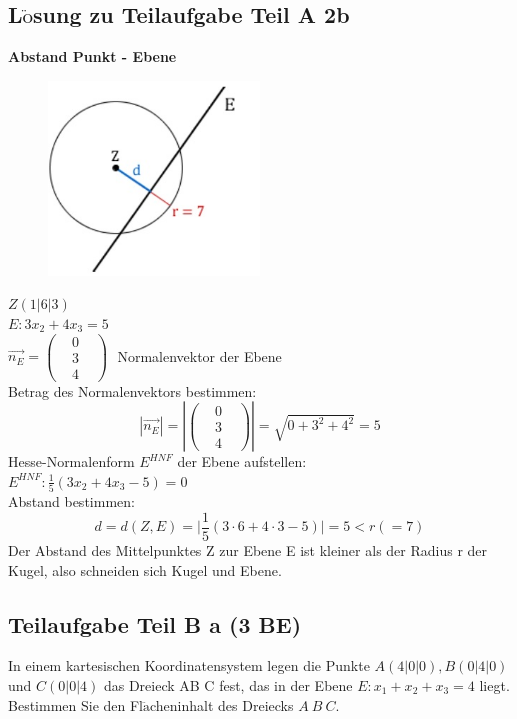 \documentclass[a4 paper, 12pt]{report}
\theoremstyle{plain}
\begin{document}
\subsection*{L$\ddot{\mbox{o}}$sung zu Teilaufgabe Teil A 2b}
\textbf{Abstand Punkt - Ebene}
\begin{figure}[h]
	\centering
		\includegraphics[width=0.50\textwidth]{image4.jpg}
	\label{fig:image4}
\end{figure}
$$$$
$Z(1|6|3)$\\
$E: 3x_2+4x_3 = 5$\\
$\stackrel{\longrightarrow}{n_E} = \begin{pmatrix}
&0&\\
&3&\\
&4&
\end{pmatrix}~~~$Normalenvektor der Ebene\\
Betrag des Normalenvektors bestimmen:
$$
|\stackrel{\longrightarrow}{n_E}| = \left|\begin{pmatrix}
&0&\\
&3&\\
&4&
\end{pmatrix}
\right| = \sqrt{0+3^2+4^2} = 5
$$
Hesse-Normalenform $E^{HNF}$ der Ebene aufstellen:\\
$E^{HNF}:\frac{1}{5}(3x_2+4x_3-5) = 0$\\
Abstand bestimmen:
$$
d = d(Z,E) = \bigg|\frac{1}{5}(3\cdot 6+ 4\cdot 3-5)\bigg| = 5<r(=7)
$$
Der Abstand des Mittelpunktes Z zur Ebene E ist kleiner als der Radius r der Kugel, also
schneiden sich Kugel und Ebene.
\subsection*{Teilaufgabe Teil B a (3 BE)}
In einem kartesischen Koordinatensystem legen die Punkte $A(4|0|0), B(0|4|0)$ und $C(0|0|4)$ das Dreieck AB C fest, das in der Ebene $E : x_1 + x_2 + x_3 = 4$ liegt.\\
Bestimmen Sie den Fl$\ddot{\mbox{a}}$cheninhalt des Dreiecks $A~B~C$.
\end{document}
